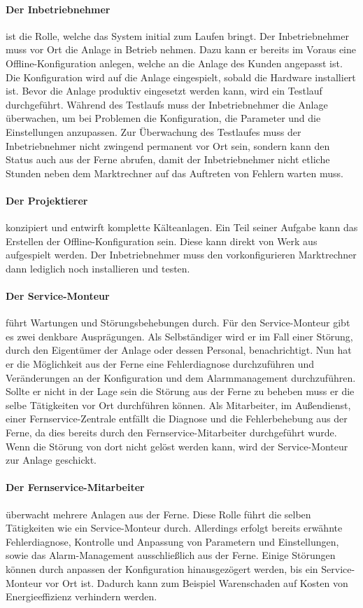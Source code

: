 \documentclass[11pt,a4paper]{report}
\begin{document}
\paragraph{Der Inbetriebnehmer} ist die Rolle, welche das System initial zum Laufen bringt. Der Inbetriebnehmer muss vor Ort die Anlage in Betrieb nehmen. Dazu kann er bereits im Voraus eine Offline-Konfiguration anlegen, welche an die Anlage des Kunden angepasst ist. Die Konfiguration wird auf die Anlage eingespielt, sobald die Hardware installiert ist. Bevor die Anlage produktiv eingesetzt werden kann, wird ein Testlauf durchgeführt. Während des Testlaufs muss der Inbetriebnehmer die Anlage überwachen, um bei Problemen die Konfiguration, die Parameter und die Einstellungen anzupassen. Zur Überwachung des Testlaufes muss der Inbetriebnehmer nicht zwingend permanent vor Ort sein, sondern kann den Status auch aus der Ferne abrufen, damit der Inbetriebnehmer nicht etliche Stunden neben dem Marktrechner auf das Auftreten von Fehlern warten muss.

\paragraph{Der Projektierer} konzipiert und entwirft komplette Kälteanlagen. Ein Teil seiner Aufgabe kann das Erstellen der Offline-Konfiguration sein. Diese kann direkt von Werk aus aufgespielt werden. Der Inbetriebnehmer muss den vorkonfigurieren Marktrechner dann lediglich noch installieren und testen.

\paragraph{Der Service-Monteur} führt Wartungen und Störungsbehebungen durch. Für den Service-Monteur gibt es zwei denkbare Ausprägungen. Als Selbständiger wird er im Fall einer Störung, durch den Eigentümer der Anlage oder dessen Personal, benachrichtigt. Nun hat er die Möglichkeit aus der Ferne eine Fehlerdiagnose durchzuführen und Veränderungen an der Konfiguration und dem Alarmmanagement durchzuführen. Sollte er nicht in der Lage sein die Störung aus der Ferne zu beheben muss er die selbe Tätigkeiten vor Ort durchführen können. Als Mitarbeiter, im Außendienst, einer Fernservice-Zentrale entfällt die Diagnose und die Fehlerbehebung aus der Ferne, da dies bereits durch den Fernservice-Mitarbeiter durchgeführt wurde. Wenn die Störung von dort nicht gelöst werden kann, wird der Service-Monteur zur Anlage geschickt.

\paragraph{Der Fernservice-Mitarbeiter} überwacht mehrere Anlagen aus der Ferne. Diese Rolle führt die selben Tätigkeiten wie ein Service-Monteur durch. Allerdings erfolgt bereits erwähnte Fehlerdiagnose, Kontrolle und Anpassung von Parametern und Einstellungen, sowie das Alarm-Management ausschließlich aus der Ferne. Einige Störungen können durch anpassen der Konfiguration hinausgezögert werden, bis ein Service-Monteur vor Ort ist. Dadurch kann zum Beispiel Warenschaden auf Kosten von Energieeffizienz verhindern werden.
\end{document}
